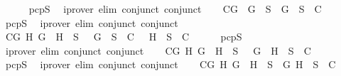 \begin{isabellebody}
\ \ \ \ \isamarkupfalse%
\ pcpS\ \isamarkupfalse%
\ {\isacharparenleft}iprover\ elim{\isacharcolon}\ conjunct{}\ conjunct{}{\isacharparenright}\isanewline
\ \ \isamarkupfalse%
\ C{}{\isacharcolon}{\isachardoublequoteopen}{\isasymforall}G{\isachardot}\ \isactrlbold {\isasymnot}\ {\isacharparenleft}\isactrlbold {\isasymnot}G{\isacharparenright}\ {\isasymin}\ S\ {\isasymlongrightarrow}\ {\isacharbraceleft}G{\isacharbraceright}\ {\isasymunion}\ S\ {\isasymin}\ C{\isachardoublequoteclose}\isanewline
\ \ \ \ \isamarkupfalse%
\ pcpS\ \isamarkupfalse%
\ {\isacharparenleft}iprover\ elim{\isacharcolon}\ conjunct{}\ conjunct{}{\isacharparenright}\isanewline
\ \ \isamarkupfalse%
\ C{}{\isacharcolon}{\isachardoublequoteopen}{\isasymforall}G\ H{\isachardot}\ \isactrlbold {\isasymnot}{\isacharparenleft}G\ \isactrlbold {\isasymand}\ H{\isacharparenright}\ {\isasymin}\ S\ {\isasymlongrightarrow}\ {\isacharbraceleft}\isactrlbold {\isasymnot}\ G{\isacharbraceright}\ {\isasymunion}\ S\ {\isasymin}\ C\ {\isasymor}\ {\isacharbraceleft}\isactrlbold {\isasymnot}\ H{\isacharbraceright}\ {\isasymunion}\ S\ {\isasymin}\ C{\isachardoublequoteclose}\isanewline
\ \ \ \ \isamarkupfalse%
\ pcpS\ \isamarkupfalse%
\ {\isacharparenleft}iprover\ elim{\isacharcolon}\ conjunct{}\ conjunct{}{\isacharparenright}\isanewline
\ \ \isamarkupfalse%
\ C{}{\isacharcolon}{\isachardoublequoteopen}{\isasymforall}G\ H{\isachardot}\ \isactrlbold {\isasymnot}{\isacharparenleft}G\ \isactrlbold {\isasymor}\ H{\isacharparenright}\ {\isasymin}\ S\ {\isasymlongrightarrow}\ {\isacharbraceleft}\isactrlbold {\isasymnot}\ G{\isacharcomma}\ \isactrlbold {\isasymnot}\ H{\isacharbraceright}\ {\isasymunion}\ S\ {\isasymin}\ C{\isachardoublequoteclose}\isanewline
\ \ \ \ \isamarkupfalse%
\ pcpS\ \isamarkupfalse%
\ {\isacharparenleft}iprover\ elim{\isacharcolon}\ conjunct{}\ conjunct{}{\isacharparenright}\isanewline
\ \ \isamarkupfalse%
\ C{}{\isacharcolon}{\isachardoublequoteopen}{\isasymforall}G\ H{\isachardot}\ \isactrlbold {\isasymnot}{\isacharparenleft}G\ \isactrlbold {\isasymrightarrow}\ H{\isacharparenright}\ {\isasymin}\ S\ {\isasymlongrightarrow}\ {\isacharbraceleft}G{\isacharcomma}\isactrlbold {\isasymnot}\ H{\isacharbraceright}\ {\isasymunion}\ S\ {\isasymin}\ C{\isachardoublequoteclose}\isanewline

\end{isabellebody}
